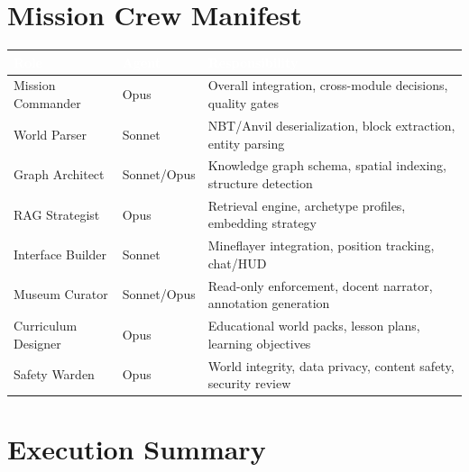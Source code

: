 \documentclass[11pt,letterpaper]{article}
\newcommand{\tableheader}[1]{\textbf{\sffamily\textcolor{white}{#1}}}
\begin{document}
\section{Mission Crew Manifest}

\begin{center}
\begin{tabularx}{\textwidth}{L{3cm}L{2.5cm}X}
\toprule
{}
\tableheader{Role} & \tableheader{Agent} & \tableheader{Responsibility} \\
\midrule
Mission Commander & Opus & Overall integration, cross-module decisions, quality gates \\
World Parser & Sonnet & NBT/Anvil deserialization, block extraction, entity parsing \\
Graph Architect & Sonnet/Opus & Knowledge graph schema, spatial indexing, structure detection \\
RAG Strategist & Opus & Retrieval engine, archetype profiles, embedding strategy \\
Interface Builder & Sonnet & Mineflayer integration, position tracking, chat/HUD \\
Museum Curator & Sonnet/Opus & Read-only enforcement, docent narrator, annotation generation \\
Curriculum Designer & Opus & Educational world packs, lesson plans, learning objectives \\
Safety Warden & Opus & World integrity, data privacy, content safety, security review \\
\bottomrule
\end{tabularx}
\end{center}

\section{Execution Summary}
\end{document}
